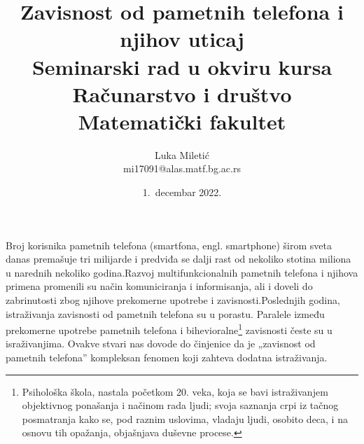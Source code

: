 \documentclass[a4paper]{article}
\begin{document}
\title{Zavisnost od pametnih telefona i njihov uticaj\\
	\small{Seminarski rad u okviru kursa \\
	       Računarstvo i društvo \\
	       Matematički fakultet }
	  }
\author{Luka Miletić \\ mi17091@alas.matf.bg.ac.rs}
\date{1.~decembar 2022.}
\maketitle

\abstract
Broj korisnika pametnih telefona (smartfona, engl. smartphone) širom sveta danas premašuje tri milijarde
i predviđa se dalji rast od nekoliko stotina miliona u narednih nekoliko godina.Razvoj multifunkcionalnih
pametnih telefona i njihova primena promenili su način komuniciranja i informisanja, ali i doveli do
zabrinutosti zbog njihove prekomerne upotrebe i zavisnosti.Poslednjih godina, istraživanja zavisnosti od
pametnih telefona su u porastu. Paralele između prekomerne upotrebe pametnih telefona
i bihevioralne\footnote{Psihološka škola, nastala početkom 20. veka,
koja se bavi istraživanjem objektivnog
ponašanja i načinom rada ljudi;
svoja saznanja crpi iz tačnog posmatranja kako se, pod raznim uslovima, vladaju 
ljudi, osobito deca, i na osnovu tih opažanja, objašnjava duševne procese.}
zavisnosti česte su u israživanjima.
Ovakve stvari nas dovode do činjenice da je „zavisnost od pametnih
telefona” kompleksan fenomen koji zahteva dodatna istraživanja.

\newpage
\tableofcontents
\newpage
\end{document}
